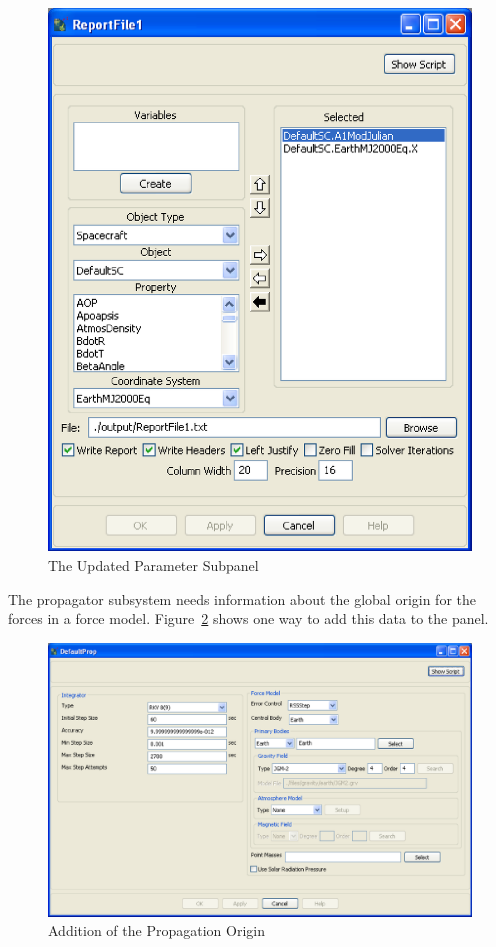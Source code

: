 \begin{figure}
\begin{center}
\includegraphics[scale=0.5]{Images/ParameterSubpanel.eps}
\caption{\label{figure:ParameterSubpanel}The Updated Parameter Subpanel}
\end{center}
\end{figure}

The propagator subsystem needs information about the global origin for the forces in a force model.
Figure~\ref{figure:PropPanelUpdate} shows one way to add this data to the panel.

\begin{figure}
\begin{center}
\includegraphics[scale=0.5]{Images/PropPanel.eps}
\caption{\label{figure:PropPanelUpdate}Addition of the Propagation Origin}
\end{center}
\end{figure}

